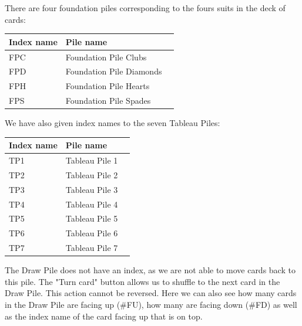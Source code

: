 \documentclass[runningheads,a4paper]{llncs}
\begin{document}
There are four foundation piles corresponding to the fours suits in the deck of cards:
\begin{center}
	\begin{tabular}{ | l | l | l | }
		\hline
		Index name & Pile name \\ \hline
		FPC & Foundation Pile Clubs  \\ \hline
		FPD & Foundation Pile Diamonds \\ \hline
		FPH & Foundation Pile Hearts  \\ \hline
		FPS & Foundation Pile Spades \\ \hline
	\end{tabular}
\end{center}
We have also given index names to the seven Tableau Piles:
\begin{center}
	\begin{tabular}{ | l | l | l | }
		\hline
		Index name & Pile name \\ \hline
		TP1 & Tableau Pile 1  \\ \hline
		TP2 & Tableau Pile 2 \\ \hline
		TP3 & Tableau Pile 3  \\ \hline
		TP4 & Tableau Pile 4 \\ \hline
		TP5 & Tableau Pile 5  \\ \hline
		TP6 & Tableau Pile 6  \\ \hline
		TP7 & Tableau Pile 7  \\ \hline
	\end{tabular}
\end{center}
The Draw Pile does not have an index, as we are not able to move cards back to this pile. 
The "Turn card" button allows us to shuffle to the next card in the Draw Pile. This action cannot be reversed. 
Here we can also see how many cards in the Draw Pile are facing up (\#FU), how many are facing down (\#FD) as well as the index name of the card facing up that is on top.
\newline
\end{document}
